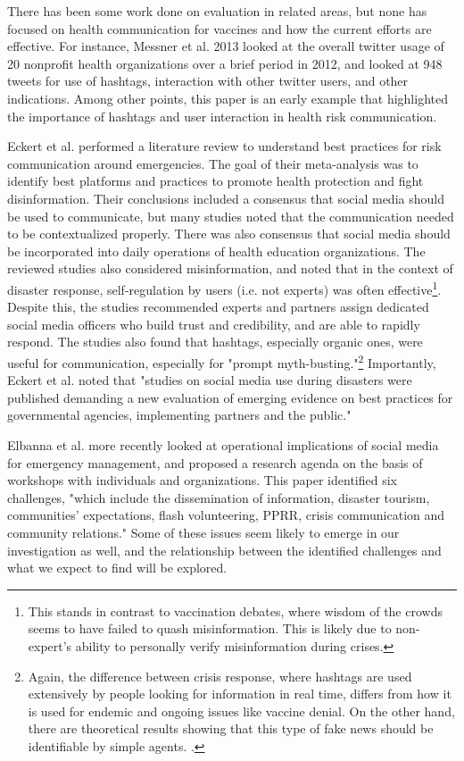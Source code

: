 \documentclass{article}
\begin{document}
There has been some work done on evaluation in related areas, but none has focused on health communication for vaccines and how the current efforts are effective. For instance, Messner et al. 2013 looked at the overall twitter usage of 20 nonprofit health organizations over a brief period in 2012, and looked at 948 tweets for use of hashtags, interaction with other twitter users, and other indications. Among other points, this paper is an early example that highlighted the importance of hashtags and user interaction in health risk communication.

Eckert et al. performed a literature review to understand best practices for risk communication around emergencies. The goal of their meta-analysis was to identify best platforms and practices to promote health protection and fight disinformation. Their conclusions included a consensus that social media should be used to communicate, but many studies noted that the communication needed to be contextualized properly. There was also consensus that  social media should be incorporated into daily operations of health education organizations. The reviewed studies also considered misinformation, and noted that in the context of disaster response, self-regulation by users (i.e. not experts) was often effective\footnote{This stands in contrast to vaccination debates, where wisdom of the crowds seems to have failed to quash misinformation. This is likely due to non-expert's ability to personally verify misinformation during crises.}. Despite this, the studies recommended experts and partners assign dedicated social media officers who build trust and credibility, and are able to rapidly respond. The studies also found that hashtags, especially organic ones, were useful for communication, especially for "prompt myth-busting."\footnote{Again, the difference between crisis response, where hashtags are used extensively by people looking for information in real time, differs from how it is used for endemic and ongoing issues like vaccine denial. On the other hand, there are theoretical results showing that this type of fake news should be identifiable by simple agents. \cite{Aymanns2017}.} Importantly, Eckert et al. noted that "studies on social media use during disasters were published demanding a new evaluation of emerging evidence on best practices for governmental agencies, implementing partners and the public." \cite{Eckert2018}

Elbanna et al. more recently looked at operational implications of social media for emergency management, and proposed a research agenda on the basis of workshops with individuals and organizations. This paper identified six challenges, "which include the dissemination of information, disaster tourism, communities’ expectations, flash volunteering, PPRR, crisis communication and community relations." \cite{Elbanna2019} Some of these issues seem likely to emerge in our investigation as well, and the relationship between the identified challenges and what we expect to find will be explored.
\end{document}
